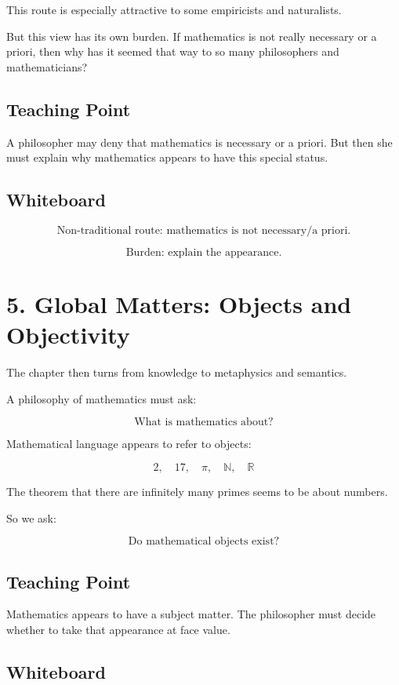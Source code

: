 \documentclass[11pt]{article}
\begin{document}
This route is especially attractive to some empiricists and naturalists.

But this view has its own burden. If mathematics is not really necessary or a priori, then
why has it seemed that way to so many philosophers and mathematicians?

\subsection*{Teaching Point}

A philosopher may deny that mathematics is necessary or a priori. But then she must
explain why mathematics appears to have this special status.

\subsection*{Whiteboard}

\[
\boxed{
\text{Non-traditional route: mathematics is not necessary/a priori.}
}
\]

\[
\boxed{
\text{Burden: explain the appearance.}
}
\]

\section*{5. Global Matters: Objects and Objectivity}

The chapter then turns from knowledge to metaphysics and semantics.

A philosophy of mathematics must ask:

\[
\text{What is mathematics about?}
\]

Mathematical language appears to refer to objects:

\[
2,\quad 17,\quad \pi,\quad \mathbb{N},\quad \mathbb{R}
\]

The theorem that there are infinitely many primes seems to be about numbers.

So we ask:

\[
\boxed{
\text{Do mathematical objects exist?}
}
\]

\subsection*{Teaching Point}

Mathematics appears to have a subject matter. The philosopher must decide whether to
take that appearance at face value.

\subsection*{Whiteboard}
\end{document}
